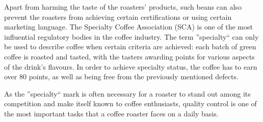 Apart from harming the taste of the roasters' products, such beans can also prevent
the roasters from achieving certain certifications or using certain marketing language.
The Specialty Coffee Association (SCA) is one of the most influential regulatory
bodies in the coffee industry. The term ''specialty`` can only be used to describe
coffee when certain criteria are achieved: each batch of green coffee is roasted
and tasted, with the tasters awarding points for various aspects of the drink's flavours.
In order to achieve specialty status, the coffee has to earn over 80 points, as
well as being free from the previously mentioned defects.

As the ''specialty`` mark is often necessary for a roaster to stand out among
its competition and make itself known to coffee enthusiasts, quality control is one
of the most important tasks that a coffee roaster faces on a daily basis.


